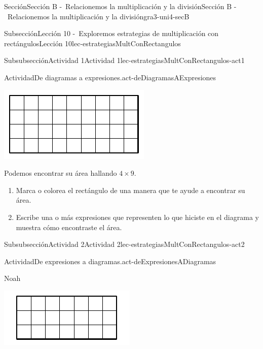 \documentclass[twoside,10pt,]{article}
\begin{document}
\begin{sectionptx}{Sección}{Sección B -~Relacionemos la multiplicación y la división}{}{Sección B -~Relacionemos la multiplicación y la división}{}{}{gra3-uni4-secB}
\begin{subsectionptx}{Subsección}{Lección 10 -~Exploremos estrategias de multiplicación con rectángulos}{}{Lección 10}{}{}{lec-estrategiasMultConRectangulos}
\begin{subsubsectionptx}{Subsubsección}{Actividad 1}{}{Actividad 1}{}{}{lec-estrategiasMultConRectangulos-act1}
\begin{activity}{Actividad}{De diagramas a expresiones.}{act-deDiagramasAExpresiones}
\begin{enumerate}
\begin{image}{0}{1}{0}{}
\includegraphics[width=\linewidth]{external/svg-source/tikz-file-153048.pdf}
\end{image}%
Podemos encontrar su área hallando \(4 \times 9\).%
%
\begin{enumerate}
\item{}Marca o colorea el rectángulo de una manera que te ayude a encontrar su área.%
\item{}Escribe una o más expresiones que representen lo que hiciste en el diagrama y muestra cómo encontraste el área.%
\end{enumerate}
\end{enumerate}
\end{activity}%
\end{subsubsectionptx}
%
%
\typeout{************************************************}
\typeout{************************************************}
%
\begin{subsubsectionptx}{Subsubsección}{Actividad 2}{}{Actividad 2}{}{}{lec-estrategiasMultConRectangulos-act2}
\begin{activity}{Actividad}{De expresiones a diagramas.}{act-deExpresionesADiagramas}%
\begin{sidebyside}{3}{0.0166666666666667}{0.0166666666666667}{0.0333333333333333}%
\begin{sbspanel}{0.3}%
Noah%
\par
\includegraphics[width=\linewidth]{external/svg-source/tikz-file-153051.pdf}

\end{sbspanel}
\end{sidebyside}
\end{activity}
\end{subsubsectionptx}
\end{subsectionptx}
\end{sectionptx}
\end{document}
